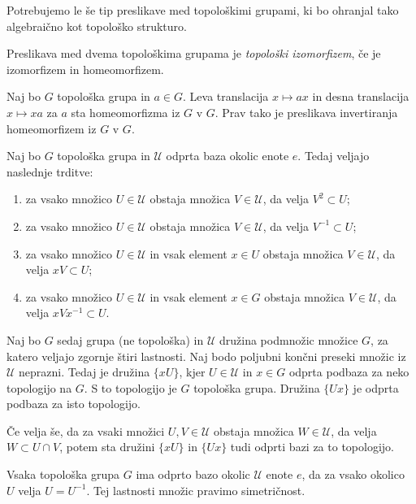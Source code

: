 \documentclass[mat1]{fmfdelo}
\newcommand{\Ucurl}{\mathcal{U}}
\begin{document}
Potrebujemo le še tip preslikave med topološkimi grupami, ki bo ohranjal tako algebraično kot topološko strukturo.
\begin{definicija}\label{def:topizo}
Preslikava med dvema topološkima grupama je \emph{topološki izomorfizem}, če je izomorfizem in homeomorfizem.
\end{definicija}


\begin{trditev}\label{trd:trans}
Naj bo $G$ topološka grupa in $a \in G$. Leva translacija $x \mapsto ax$ in desna translacija $x \mapsto xa$ za $a$ sta homeomorfizma iz $G$ v $G$. Prav tako je preslikava invertiranja homeomorfizem iz $G$ v $G$.
\end{trditev}

\begin{trditev}\label{trd:okolice}
Naj bo $G$ topološka grupa in $\Ucurl$ odprta baza okolic enote $e$. Tedaj veljajo naslednje trditve:
\begin{enumerate}
\item za vsako množico $U \in \Ucurl$ obstaja množica $V \in \Ucurl$, da velja $V^{2} \subset U$;
\item za vsako množico $U \in \Ucurl$ obstaja množica $V \in \Ucurl$, da velja $V^{-1} \subset U$;
\item za vsako množico $U \in \Ucurl$ in vsak element $x \in U$ obstaja množica $V \in \Ucurl$, da velja $xV \subset U$;
\item za vsako množico $U \in \Ucurl$ in vsak element $x \in G$ obstaja množica $V \in \Ucurl$, da velja $xVx^{-1} \subset U$.
\end{enumerate}

Naj bo $G$ sedaj grupa (ne topološka) in $\Ucurl$ družina podmnožic množice $G$, za katero veljajo zgornje štiri lastnosti. Naj bodo poljubni končni preseki množic iz $\Ucurl$ neprazni. Tedaj je družina $\lbrace xU \rbrace$, kjer $U \in \Ucurl$ in $x \in G$ odprta podbaza za neko topologijo na $G$. S to topologijo je $G$ topološka grupa. Družina $\lbrace Ux \rbrace$ je odprta podbaza za isto topologijo.

Če velja še, da za vsaki množici $U,V \in \Ucurl$ obstaja množica $W \in \Ucurl$, da velja $W \subset U \cap V$, potem sta družini $\lbrace xU \rbrace$ in $\lbrace Ux \rbrace$ tudi odprti bazi za to topologijo.
\end{trditev}

\begin{trditev}
Vsaka topološka grupa $G$ ima odprto bazo okolic $\Ucurl$ enote $e$, da za vsako okolico $U$ velja $U = U^{-1}$. Tej lastnosti množic pravimo simetričnost.
\end{trditev}
\end{document}
